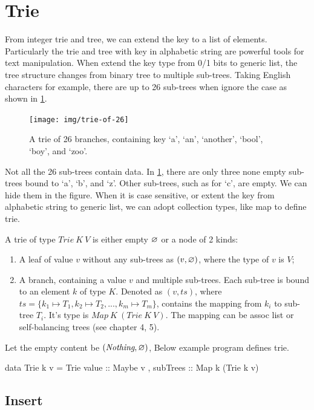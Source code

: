 \documentclass[b5paper]{article}
\begin{document}
\section{Trie}
From integer trie and tree, we can extend the key to a list of elements. Particularly the trie and tree with key in alphabetic string are powerful tools for text manipulation. When extend the key type from 0/1 bits to generic list, the tree structure changes from binary tree to multiple sub-trees. Taking English characters for example, there are up to 26 sub-trees when ignore the case as shown in \cref{fig:trie-of-26}.

\begin{figure}[htbp]
  \centering
  \texttt{[image: img/trie-of-26]}
  \caption{A trie of 26 branches, containing key `a', `an', `another', `bool', `boy', and `zoo'.}
  \label{fig:trie-of-26}
\end{figure}

Not all the 26 sub-trees contain data. In \cref{fig:trie-of-26}, there are only three none empty sub-trees bound to `a', `b', and `z'. Other sub-trees, such as for `c', are empty. We can hide them in the figure. When it is case sensitive, or extent the key from alphabetic string to generic list, we can adopt collection types, like map to define trie.

A trie of type $Trie\ K\ V$ is either empty $\varnothing$ or a node of 2 kinds:

\begin{enumerate}
\item A leaf of value $v$ without any sub-trees as $(v, \varnothing)$, where the type of $v$ is $V$;
\item A branch, containing a value $v$ and multiple sub-trees. Each sub-tree is bound to an element $k$ of type $K$. Denoted as $(v, ts)$, where $ts = \{ k_1 \mapsto T_1, k_2 \mapsto T_2, ..., k_m \mapsto T_m \}$, contains the mapping from $k_i$ to sub-tree $T_i$. It's type is $Map\ K\ (Trie\ K\ V)$. The mapping can be assoc list or self-balancing trees (see chapter 4, 5).
\end{enumerate}

Let the empty content be $(\textit{Nothing}, \varnothing)$, Below example program defines trie.

\begin{Haskell}
data Trie k v = Trie { value :: Maybe v
                     , subTrees :: Map k (Trie k v)}
\end{Haskell}

\subsection{Insert}
\end{document}
